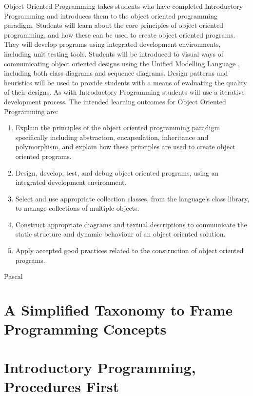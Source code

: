 Object Oriented Programming takes students who have completed Introductory Programming and introduces them to the object oriented programming paradigm. Students will learn about the core principles of object oriented programming, and how these can be used to create object oriented programs. They will develop programs using integrated development environments, including  unit testing tools. Students will be introduced to visual ways of communicating object oriented designs using the Unified Modelling Language \cite{Fowler:2004}, including both class diagrams and sequence diagrams. Design patterns and heuristics will be used to provide students with a means of evaluating the quality of their designs. As with Introductory Programming students will use a iterative development process. The intended learning outcomes for Object Oriented Programming are:
\begin{enumerate}
	\item Explain the principles of the object oriented programming paradigm specifically including abstraction, encapsulation, inheritance and polymorphism, and explain how these principles are used to create object oriented programs.
	\item Design, develop, test, and debug object oriented programs, using an integrated development environment.
	\item Select and use appropriate collection classes, from the language's class library, to manage collections of multiple objects.
	\item Construct appropriate diagrams and textual descriptions to communicate the static structure and dynamic behaviour of an object oriented solution.
	\item Apply accepted good practices related to the construction of object oriented programs.
\end{enumerate}

Pascal \cite{Becker:2002}




\section{A Simplified Taxonomy to Frame Programming Concepts} %
\label{sec:a_simplified_taxonomy_to_frame_programming_concepts}


\section{Introductory Programming, Procedures First} %
\label{sec:introductory_programming_procedures_first}

